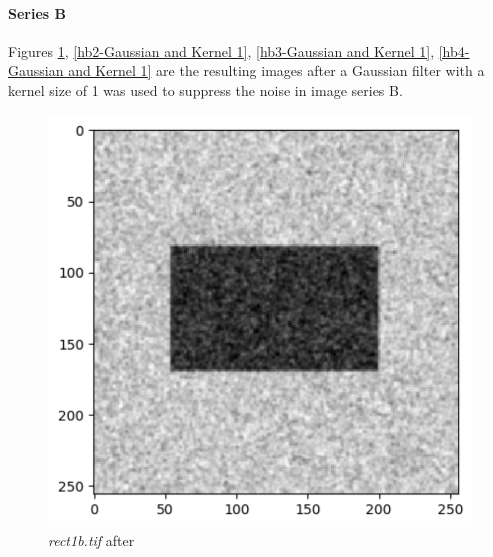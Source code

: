 \documentclass[runningheads]{llncs}
\begin{document}
\paragraph*{\textbf{Series B}}
Figures \ref{hb1-Gaussian and Kernel 1},  \ref{hb2-Gaussian and Kernel 1}, \ref{hb3-Gaussian and Kernel 1}, \ref{hb4-Gaussian and Kernel 1} are the resulting images after a Gaussian filter with a kernel size of 1 was used to suppress the noise in image series B. 
\begin{figure}[h!]
\begin{minipage}[h]{0.47\linewidth}
\begin{center}
\includegraphics[width=1\linewidth]{Report/Result_Images/image_hb1.png} 
\caption{\emph{rect1b.tif} after}
\label{hb1-Gaussian and Kernel 1}
\end{center} 
\end{minipage}
\hfill
\vspace{0.2 cm}
\begin{minipage}[h]{0.47\linewidth}
\begin{center}

\end{center}
\end{minipage}
\end{figure}
\end{document}
